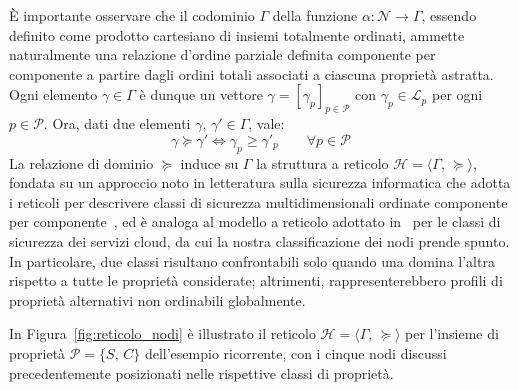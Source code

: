 È importante osservare che il codominio $\Gamma$ della funzione $\alpha : \mathcal{N} \rightarrow \Gamma$, essendo definito come prodotto cartesiano di insiemi totalmente ordinati, ammette naturalmente una relazione d'ordine parziale definita componente per componente a partire dagli ordini totali associati a ciascuna proprietà astratta. Ogni elemento $\gamma \in \Gamma$ è dunque un vettore $\gamma = [\gamma_p]_{p \in \mathcal{P}}$ con $\gamma_p \in \mathcal{L}_{p}$ per ogni $p \in \mathcal{P}$. Ora, dati due elementi $\gamma,\, \gamma' \in \Gamma$, vale:
\begin{equation}
    \gamma \succeq \gamma' \iff \gamma_p \geq \gamma'_p 
    \qquad 
    \forall p \in \mathcal{P}
\end{equation}
La relazione di dominio $\succeq$ induce su $\Gamma$ la struttura a reticolo $\mathcal{H} = \langle \Gamma,\, \succeq \rangle$, fondata su un approccio noto in letteratura sulla sicurezza informatica che adotta i reticoli per descrivere classi di sicurezza multidimensionali ordinate componente per componente~\cite{lattice-based-access-control}, ed è analoga al modello a reticolo adottato in~\cite{sec-aware-data-alloc-multicloud} per le classi di sicurezza dei servizi cloud, da cui la nostra classificazione dei nodi prende spunto. In particolare, due classi risultano confrontabili solo quando una domina l'altra rispetto a tutte le proprietà considerate; altrimenti, rappresenterebbero profili di proprietà alternativi non ordinabili globalmente.

In Figura~\ref{fig:reticolo_nodi} è illustrato il reticolo $\mathcal{H} = \langle \Gamma,\, \succeq \rangle$ per l'insieme di proprietà $\mathcal{P} = \{S,\, C\}$ dell'esempio ricorrente, con i cinque nodi discussi precedentemente posizionati nelle rispettive classi di proprietà.

